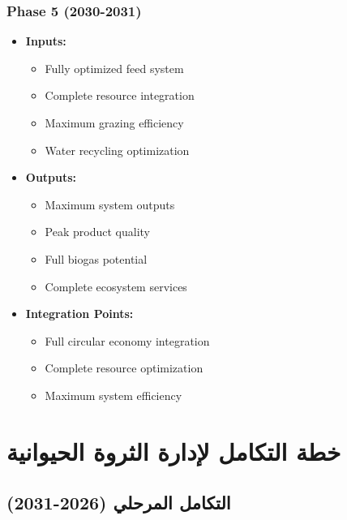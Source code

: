 \subsubsection{Phase 5 (2030-2031)}
\begin{itemize}
    \item \textbf{Inputs:}
    \begin{itemize}
        \item Fully optimized feed system
        \item Complete resource integration
        \item Maximum grazing efficiency
        \item Water recycling optimization
    \end{itemize}
    \item \textbf{Outputs:}
    \begin{itemize}
        \item Maximum system outputs
        \item Peak product quality
        \item Full biogas potential
        \item Complete ecosystem services
    \end{itemize}
    \item \textbf{Integration Points:}
    \begin{itemize}
        \item Full circular economy integration
        \item Complete resource optimization
        \item Maximum system efficiency
    \end{itemize}
\end{itemize}

\section{خطة التكامل لإدارة الثروة الحيوانية}

\subsection{التكامل المرحلي (2026-2031)}

